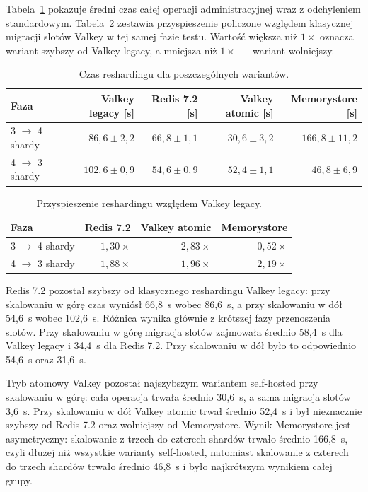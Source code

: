 Tabela~\ref{tab:reshard-duration} pokazuje średni czas całej operacji administracyjnej wraz z odchyleniem standardowym. Tabela~\ref{tab:reshard-speedup} zestawia przyspieszenie policzone względem klasycznej migracji slotów Valkey w tej samej fazie testu. Wartość większa niż $1\times$ oznacza wariant szybszy od Valkey legacy, a mniejsza niż $1\times$ --- wariant wolniejszy.

\begin{table}[htbp]
\centering
\caption{Czas reshardingu dla poszczególnych wariantów.}
\label{tab:reshard-duration}
\begin{tabular}{lrrrr}
\toprule
Faza & Valkey legacy [s] & Redis 7.2 [s] & Valkey atomic [s] & Memorystore [s] \\
\midrule
3 $\rightarrow$ 4 shardy & $86{,}6 \pm 2{,}2$ & $66{,}8 \pm 1{,}1$ & $30{,}6 \pm 3{,}2$ & $166{,}8 \pm 11{,}2$ \\
4 $\rightarrow$ 3 shardy & $102{,}6 \pm 0{,}9$ & $54{,}6 \pm 0{,}9$ & $52{,}4 \pm 1{,}1$ & $46{,}8 \pm 6{,}9$ \\
\bottomrule
\end{tabular}
\end{table}

\begin{table}[htbp]
\centering
\caption{Przyspieszenie reshardingu względem Valkey legacy.}
\label{tab:reshard-speedup}
\begin{tabular}{lrrr}
\toprule
Faza & Redis 7.2 & Valkey atomic & Memorystore \\
\midrule
3 $\rightarrow$ 4 shardy & $1{,}30\times$ & $2{,}83\times$ & $0{,}52\times$ \\
4 $\rightarrow$ 3 shardy & $1{,}88\times$ & $1{,}96\times$ & $2{,}19\times$ \\
\bottomrule
\end{tabular}
\end{table}

\FloatBarrier

Redis 7.2 pozostał szybszy od klasycznego reshardingu Valkey legacy: przy skalowaniu w górę czas wyniósł 66{,}8~s wobec 86{,}6~s, a przy skalowaniu w dół 54{,}6~s wobec 102{,}6~s. Różnica wynika głównie z krótszej fazy przenoszenia slotów. Przy skalowaniu w górę migracja slotów zajmowała średnio 58{,}4~s dla Valkey legacy i 34{,}4~s dla Redis 7.2. Przy skalowaniu w dół było to odpowiednio 54{,}6~s oraz 31{,}6~s.

Tryb atomowy Valkey pozostał najszybszym wariantem self-hosted przy skalowaniu w górę: cała operacja trwała średnio 30{,}6~s, a sama migracja slotów 3{,}6~s. Przy skalowaniu w dół Valkey atomic trwał średnio 52{,}4~s i był nieznacznie szybszy od Redis 7.2 oraz wolniejszy od Memorystore. Wynik Memorystore jest asymetryczny: skalowanie z trzech do czterech shardów trwało średnio 166{,}8~s, czyli dłużej niż wszystkie warianty self-hosted, natomiast skalowanie z czterech do trzech shardów trwało średnio 46{,}8~s i było najkrótszym wynikiem całej grupy.

